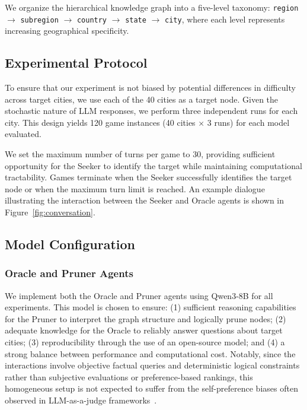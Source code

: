 \documentclass[letterpaper]{article} %
\begin{document}
We organize the hierarchical knowledge graph into a five-level taxonomy: \texttt{region} $\rightarrow$ \texttt{subregion} $\rightarrow$ \texttt{country} $\rightarrow$ \texttt{state} $\rightarrow$ \texttt{city}, where each level represents increasing geographical specificity.

\subsection{Experimental Protocol}

To ensure that our experiment is not biased by potential differences in difficulty across target cities, we use each of the 40 cities as a target node. Given the stochastic nature of LLM responses, we perform three independent runs for each city. This design yields 120 game instances (40 cities $\times$ 3 runs) for each model evaluated.

We set the maximum number of turns per game to 30, providing sufficient opportunity for the Seeker to identify the target while maintaining computational tractability. Games terminate when the Seeker successfully identifies the target node or when the maximum turn limit is reached. An example dialogue illustrating the interaction between the Seeker and Oracle agents is shown in Figure~\ref{fig:conversation}.

\subsection{Model Configuration}

\subsubsection{Oracle and Pruner Agents}

We implement both the Oracle and Pruner agents using Qwen3-8B for all experiments. This model is chosen to ensure: (1) sufficient reasoning capabilities for the Pruner to interpret the graph structure and logically prune nodes; (2) adequate knowledge for the Oracle to reliably answer questions about target cities; (3) reproducibility through the use of an open-source model; and (4) a strong balance between performance and computational cost. Notably, since the interactions involve objective factual queries and deterministic logical constraints rather than subjective evaluations or preference-based rankings, this homogeneous setup is not expected to suffer from the self-preference biases often observed in LLM-as-a-judge frameworks~\citep{chen2025llms}.
\end{document}
